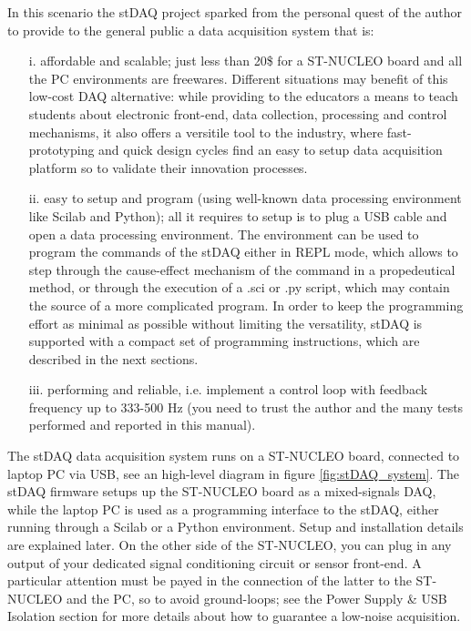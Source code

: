 \documentclass[letterpaper,10pt,english]{hitec}
\begin{document}
In this scenario the stDAQ project sparked from the personal quest of the author to provide to the general public a data acquisition system that is: 
\begin{itemize}
\item[i.] affordable and scalable; just less than 20\$ for a ST-NUCLEO board and all the PC environments are freewares. Different situations may benefit of this low-cost DAQ alternative: while providing to the educators a means to teach students about electronic front-end, data collection, processing and control mechanisms, it also offers a versitile tool to the industry, where fast-prototyping and quick design cycles find an easy to setup data acquisition platform so to validate their innovation processes.
\item[ii.] easy to setup and program (using well-known data processing environment like Scilab and Python); all it requires to setup is to plug a USB cable and open a data processing environment. The environment can be used to program the commands of the stDAQ either in REPL mode, which allows to step through the cause-effect mechanism of the command in a propedeutical method, or through the execution of a .sci or .py script, which may contain the source of a more complicated program. In order to keep the programming effort as minimal as possible without limiting the versatility, stDAQ is supported with a compact set of programming instructions, which are described in the next sections. 
\item[iii.] performing and reliable, i.e. implement a control loop with feedback frequency up to 333-500 Hz (you need to trust the author and the many tests performed and reported in this manual).
\end{itemize} 

The stDAQ data acquisition system runs on a ST-NUCLEO board, connected to laptop PC via USB, see an high-level diagram in figure \ref{fig:stDAQ_system}. The stDAQ firmware setups up the ST-NUCLEO board as a mixed-signals DAQ, while the laptop PC is used as a programming interface to the stDAQ, either running through a Scilab or a Python environment. Setup and installation details are explained later. On the other side of the ST-NUCLEO, you can plug in any output of your dedicated signal conditioning circuit or sensor front-end. A particular attention must be payed in the connection of the latter to the ST-NUCLEO and the PC, so to avoid ground-loops; see the Power Supply \& USB Isolation section for more details about how to guarantee a low-noise acquisition. 
\end{document}
